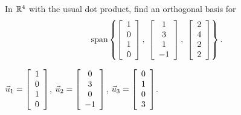 \documentclass{ximera}
\begin{document}
\begin{exercise}
  In $\R^4$ with the usual dot product, find an orthogonal basis for
  \begin{equation*}
    \sspan\set{
      \startmat{c} 1 \\ 0 \\ 1 \\  0 \stopmat,~
      \startmat{c} 1 \\ 3 \\ 1 \\ -1 \stopmat,~
      \startmat{c} 2 \\ 4 \\ 2 \\  2 \stopmat
    }.
  \end{equation*}
  \begin{solution}
    $\vect{u}_1 = \startmat{c} 1 \\ 0 \\ 1 \\ 0 \stopmat$,
    $\vect{u}_2 = \startmat{c} 0 \\ 3 \\ 0 \\ -1 \stopmat$,
    $\vect{u}_3 = \startmat{c} 0 \\ 1 \\ 0 \\ 3 \stopmat$.
  \end{solution}
\end{exercise}
\end{document}

